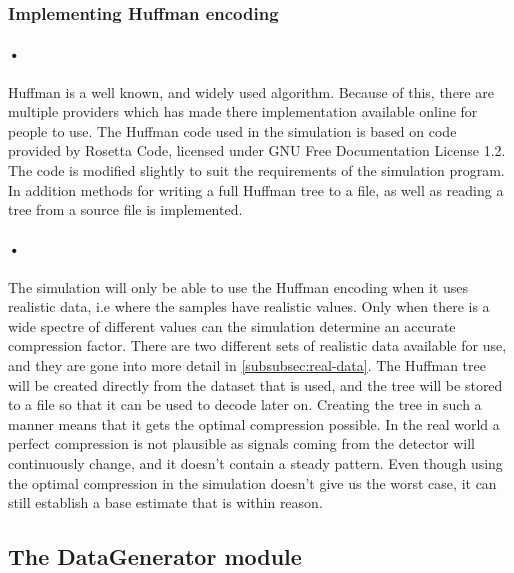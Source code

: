 \documentclass[a4paper, 12pt]{report}
\begin{document}
\begin{minipage}{\linewidth}

\end{minipage}

\subsubsection{Implementing Huffman encoding}

\paragraph{•}
Huffman is a well known, and widely used algorithm.
Because of this, there are multiple providers which has made there implementation available online for people to use.
The Huffman code used in the simulation is based on code provided by Rosetta Code, licensed under GNU Free Documentation License 1.2\cite{rosetta}\cite{gnu}.
The code is modified slightly to suit the requirements of the simulation program.
In addition methods for writing a full Huffman tree to a file, as well as reading a tree from a source file is implemented.

\paragraph{•}
The simulation will only be able to use the Huffman encoding when it uses realistic data, i.e where the samples have realistic values.
Only when there is a wide spectre of different values can the simulation determine an accurate compression factor.
There are two different sets of realistic data available for use, and they are gone into more detail in \ref{subsubsec:real-data}.
The Huffman tree will be created directly from the dataset that is used, and the tree will be stored to a file so that it can be used to decode later on.
Creating the tree in such a manner means that it gets the optimal compression possible.
In the real world a perfect compression is not plausible as signals coming from the detector will continuously change, and it doesn't contain a steady pattern.
Even though using the optimal compression in the simulation doesn't give us the worst case, it can still establish a base estimate that is within reason.

\subsection{The DataGenerator module}
\end{document}
